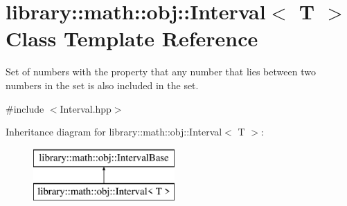 \hypertarget{classlibrary_1_1math_1_1obj_1_1_interval}{}\section{library\+:\+:math\+:\+:obj\+:\+:Interval$<$ T $>$ Class Template Reference}
\label{classlibrary_1_1math_1_1obj_1_1_interval}


Set of numbers with the property that any number that lies between two numbers in the set is also included in the set.  




{\ttfamily \#include $<$Interval.\+hpp$>$}

Inheritance diagram for library\+:\+:math\+:\+:obj\+:\+:Interval$<$ T $>$\+:\begin{figure}[H]
\begin{center}
\leavevmode
\includegraphics[height=2.000000cm]{classlibrary_1_1math_1_1obj_1_1_interval}
\end{center}
\end{figure}

